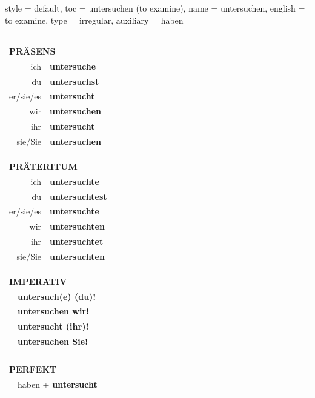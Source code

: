 \begin{verbentry}{
  style = {default},
  toc = {untersuchen (to examine)},
  name = {untersuchen},
  english = {to examine},
  type = {irregular},
  auxiliary = {haben}
}
 
    
     \vspace{5pt}

    \hrule
    
    \vspace{5pt}

  \begin{tabular}{rl}
     \multicolumn{2}{l}{\textbf{PRÄSENS} }\\
    ich & \textbf{untersuche}\\
    du & \textbf{untersuchst}\\
    er/sie/es & \textbf{untersucht}\\
    wir & \textbf{untersuchen}\\
    ihr & \textbf{untersucht}\\
    sie/Sie & \textbf{untersuchen}\\
  \end{tabular}
  \hfill
     \begin{tabular}{rl}
    \multicolumn{2}{l}{\textbf{PRÄTERITUM} }\\
    ich & \textbf{untersuchte}\\
    du & \textbf{untersuchtest}\\
    er/sie/es & \textbf{untersuchte}\\
    wir & \textbf{untersuchten}\\
    ihr & \textbf{untersuchtet}\\
    sie/Sie & \textbf{untersuchten}\\
  \end{tabular}
  \hfill
  \begin{tabular}{rl}
     \multicolumn{2}{l}{\textbf{IMPERATIV} }\\
   & \textbf{untersuch(e) (du)!}\\
   & \textbf{untersuchen wir!}\\
   & \textbf{untersucht (ihr)!}\\
   & \textbf{untersuchen Sie!}\\
   & \vspace{10pt}
  \end{tabular}

    \vspace{10pt}

 \begin{tabular}{rl}
     \multicolumn{2}{l}{\textbf{PERFEKT}}\\
   & haben + \textbf{untersucht}\\
  \end{tabular}
\hfill
   \begin{tabular}{rl}
   

\end{tabular}
\end{verbentry}
